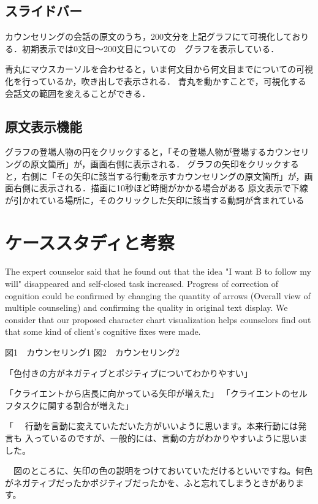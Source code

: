 \documentclass[shuuron]{kuee}
\begin{document}
\subsection{スライドバー}

カウンセリングの会話の原文のうち，200文分を上記グラフにて可視化しておりる．初期表示では0文目〜200文目についての　グラフを表示している．

青丸にマウスカーソルを合わせると，いま何文目から何文目までについての可視化を行っているか，吹き出しで表示される．
青丸を動かすことで，可視化する会話文の範囲を変えることができる．


\subsection{原文表示機能}

グラフの登場人物の円をクリックすると，「その登場人物が登場するカウンセリングの原文箇所」が，画面右側に表示される．
グラフの矢印をクリックすると，右側に「その矢印に該当する行動を示すカウンセリングの原文箇所」が，画面右側に表示される．描画に10秒ほど時間がかかる場合がある
原文表示で下線が引かれている場所に，そのクリックした矢印に該当する動詞が含まれている




\section{ケーススタディと考察}

  The expert counselor said that he found out that the idea "I want B to follow my will" disappeared and self-closed task increased. Progress of correction of cognition could be confirmed by changing the quantity of arrows (Overall view of multiple counseling) and confirming the quality in original text display. We consider that our proposed character chart visualization helps counselors find out that some kind of client's cognitive fixes were made.

  図1　カウンセリング1
  図2　カウンセリング2

  「色付きの方がネガティブとポジティブについてわかりやすい」


  「クライエントから店長に向かっている矢印が増えた」
  「クライエントのセルフタスクに関する割合が増えた」

  「
　行動を言動に変えていただいた方がいいように思います。本来行動には発言も
入っているのですが、一般的には、言動の方がわかりやすいように思いました。

　図のところに、矢印の色の説明をつけておいていただけるといいですね。何色
がネガティブだったかポジティブだったかを、ふと忘れてしまうときがあります。
\end{document}
